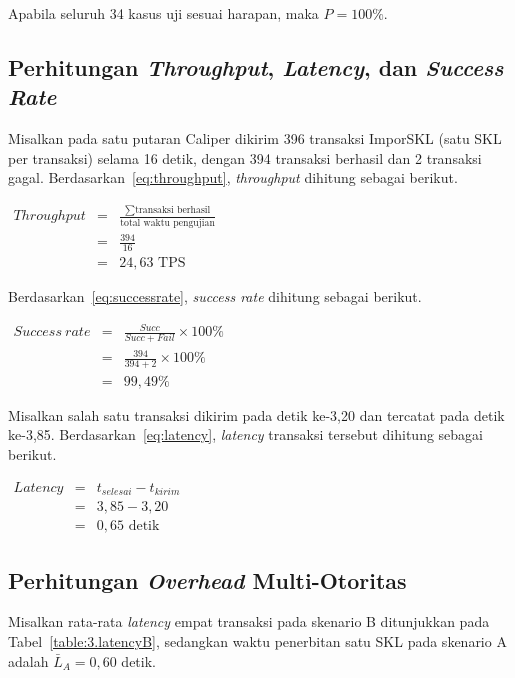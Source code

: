 \noindent Apabila seluruh 34 kasus uji sesuai harapan, maka $P = 100\%$.

\subsection{Perhitungan \textit{Throughput}, \textit{Latency}, dan \textit{Success Rate}}
Misalkan pada satu putaran Caliper dikirim 396 transaksi ImporSKL (satu SKL per transaksi) selama 16 detik, dengan 394 transaksi berhasil dan 2 transaksi gagal. Berdasarkan~\ref{eq:throughput}, \textit{throughput} dihitung sebagai berikut.

\begin{center}
$\begin{array}{rcl}
\mathit{Throughput} & = & \displaystyle\frac{\sum \mbox{transaksi berhasil}}{\mbox{total waktu pengujian}} \\[12pt]
  & = & \displaystyle\frac{394}{16} \\[12pt]
  & = & 24{,}63 \mbox{ TPS}
\end{array}$
\end{center}

\noindent Berdasarkan~\ref{eq:successrate}, \textit{success rate} dihitung sebagai berikut.

\begin{center}
$\begin{array}{rcl}
\mathit{Success\ rate} & = & \displaystyle\frac{Succ}{Succ + Fail} \times 100\% \\[12pt]
  & = & \displaystyle\frac{394}{394 + 2} \times 100\% \\[12pt]
  & = & 99{,}49\%
\end{array}$
\end{center}

\noindent Misalkan salah satu transaksi dikirim pada detik ke-3,20 dan tercatat pada detik ke-3,85. Berdasarkan~\ref{eq:latency}, \textit{latency} transaksi tersebut dihitung sebagai berikut.

\begin{center}
$\begin{array}{rcl}
\mathit{Latency} & = & t_{selesai} - t_{kirim} \\[6pt]
  & = & 3{,}85 - 3{,}20 \\[6pt]
  & = & 0{,}65 \mbox{ detik}
\end{array}$
\end{center}

\subsection{Perhitungan \textit{Overhead} Multi-Otoritas}
Misalkan rata-rata \textit{latency} empat transaksi pada skenario B ditunjukkan pada Tabel~\ref{table:3.latencyB}, sedangkan waktu penerbitan satu SKL pada skenario A adalah $\bar{L}_A = 0{,}60$ detik.

